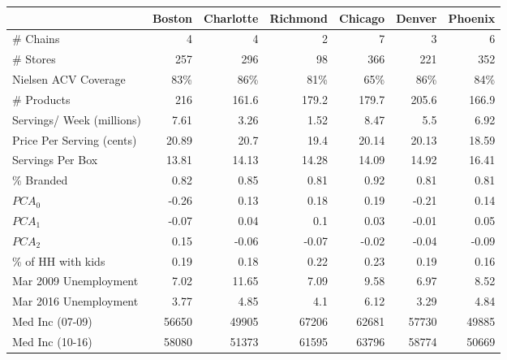 \begin{tabular}{l rrrrrr}
\toprule
{} & Boston & Charlotte & Richmond & Chicago & Denver & Phoenix \\
\midrule
\# Chains                 &      4 &         4 &        2 &       7 &      3 &       6 \\
\# Stores                 &    257 &       296 &       98 &     366 &    221 &     352 \\
Nielsen ACV Coverage      &   83\% &      86\% &     81\% &    65\% &   86\% &    84\% \\
\# Products               &    216 &     161.6 &    179.2 &   179.7 &  205.6 &   166.9 \\
Servings/ Week (millions) &   7.61 &      3.26 &     1.52 &    8.47 &    5.5 &    6.92 \\
Price Per Serving (cents) &  20.89 &      20.7 &     19.4 &   20.14 &  20.13 &   18.59 \\
Servings Per Box          &  13.81 &     14.13 &    14.28 &   14.09 &  14.92 &   16.41 \\
\% Branded                &   0.82 &      0.85 &     0.81 &    0.92 &   0.81 &    0.81 \\
$PCA_0$                   &  -0.26 &      0.13 &     0.18 &    0.19 &  -0.21 &    0.14 \\
$PCA_1$                   &  -0.07 &      0.04 &      0.1 &    0.03 &  -0.01 &    0.05 \\
$PCA_2$                   &   0.15 &     -0.06 &    -0.07 &   -0.02 &  -0.04 &   -0.09 \\
\% of HH with kids        &   0.19 &      0.18 &     0.22 &    0.23 &   0.19 &    0.16 \\
Mar 2009 Unemployment     &   7.02 &     11.65 &     7.09 &    9.58 &   6.97 &    8.52 \\
Mar 2016 Unemployment     &   3.77 &      4.85 &      4.1 &    6.12 &   3.29 &    4.84 \\
Med Inc (07-09)           &  56650 &     49905 &    67206 &   62681 &  57730 &   49885 \\
Med Inc (10-16)           &  58080 &     51373 &    61595 &   63796 &  58774 &   50669 \\
\bottomrule
\end{tabular}
